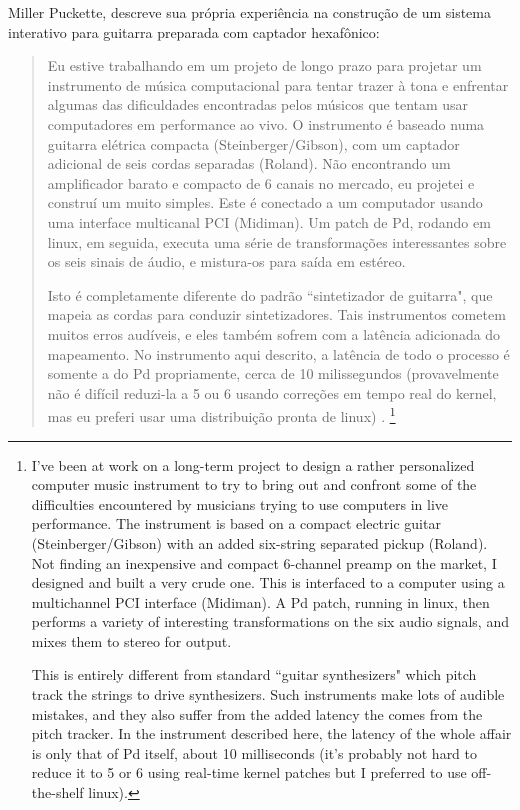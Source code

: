 \documentclass{ppgmus}
\begin{document}
 
Miller Puckette, descreve sua própria experiência na construção de um sistema interativo
para guitarra preparada com captador hexafônico:

\begin{quote}
Eu estive trabalhando em um projeto de longo prazo para projetar um
instrumento de música computacional para tentar trazer à tona e enfrentar algumas das dificuldades encontradas pelos
músicos que tentam usar computadores em performance ao vivo. O instrumento é baseado numa guitarra elétrica compacta
(Steinberger/Gibson), com um captador adicional de seis cordas separadas (Roland). Não encontrando um
amplificador barato e compacto de 6 canais no mercado, eu projetei e construí um muito simples.
Este é conectado a um computador usando uma interface multicanal PCI (Midiman). Um patch de Pd, rodando em
linux, em seguida, executa uma série de transformações interessantes sobre os seis sinais de áudio, e mistura-os
para saída em estéreo.

Isto é completamente diferente do padrão ``sintetizador de guitarra", que mapeia as cordas para conduzir
sintetizadores. Tais instrumentos cometem muitos erros audíveis, e eles também sofrem com a latência adicionada do mapeamento. 
No instrumento aqui descrito, a latência de todo o processo é
somente a do Pd propriamente, cerca de 10 milissegundos (provavelmente não é difícil reduzi-la a 5 ou 6 usando
correções em tempo real do kernel, mas eu preferi usar uma distribuição pronta de linux) \cite{Puckette_patchfor}.
\footnote{I've been at work on a long-term project to design a rather personalized 
computer music instrument to try to bring out and confront some of the difficulties encountered by 
musicians trying to use computers in live performance. The instrument is based on a compact electric 
guitar (Steinberger/Gibson) with an added six-string separated pickup (Roland). Not finding an 
inexpensive and compact 6-channel preamp on the market, I designed and built a very crude one. 
This is interfaced to a computer using a multichannel PCI interface (Midiman). A Pd patch, running in 
linux, then performs a variety of interesting transformations on the six audio signals, and mixes them 
to stereo for output.

This is entirely different from standard ``guitar synthesizers" which pitch track the strings to drive 
synthesizers. Such instruments make lots of audible mistakes, and they also suffer from the added latency 
the comes from the pitch tracker. In the instrument described here, the latency of the whole affair is 
only that of Pd itself, about 10 milliseconds (it's probably not hard to reduce it to 5 or 6 using 
real-time kernel patches but I preferred to use off-the-shelf linux).}
\end{quote}
\end{document}
